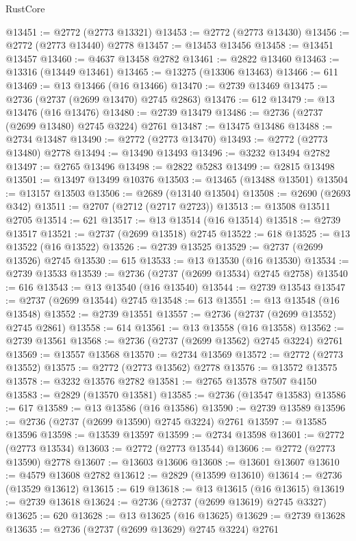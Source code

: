 \begin{lexlean}{RustCore}
\begin{coremodule}
@13451 := @2772 (@2773 @13321)
@13453 := @2772 (@2773 @13430)
@13456 := @2772 (@2773 @13440) @2778
@13457 := @13453 @13456
@13458 := @13451 @13457
@13460 := @4637 @13458 @2782
@13461 := @2822 @13460
@13463 := @13316 (@13449 @13461)
@13465 := @13275 (@13306 @13463)
@13466 := 611
@13469 := @13 @13466 (@16 @13466)
@13470 := @2739 @13469
@13475 := @2736 (@2737 (@2699 @13470) @2745 @2863)
@13476 := 612
@13479 := @13 @13476 (@16 @13476)
@13480 := @2739 @13479
@13486 := @2736 (@2737 (@2699 @13480) @2745 @3224) @2761
@13487 := @13475 @13486
@13488 := @2734 @13487
@13490 := @2772 (@2773 @13470)
@13493 := @2772 (@2773 @13480) @2778
@13494 := @13490 @13493
@13496 := @3232 @13494 @2782
@13497 := @2765 @13496
@13498 := @2822 @5283
@13499 := @2815 @13498
@13501 := @13497 @13499 @10376
@13503 := @13465 (@13488 @13501)
@13504 := @13157 @13503
@13506 := @2689 (@13140 @13504)
@13508 := @2690 (@2693 @342)
@13511 := @2707 (@2712 (@2717 @2723))
@13513 := @13508 @13511 @2705
@13514 := 621
@13517 := @13 @13514 (@16 @13514)
@13518 := @2739 @13517
@13521 := @2737 (@2699 @13518) @2745
@13522 := 618
@13525 := @13 @13522 (@16 @13522)
@13526 := @2739 @13525
@13529 := @2737 (@2699 @13526) @2745
@13530 := 615
@13533 := @13 @13530 (@16 @13530)
@13534 := @2739 @13533
@13539 := @2736 (@2737 (@2699 @13534) @2745 @2758)
@13540 := 616
@13543 := @13 @13540 (@16 @13540)
@13544 := @2739 @13543
@13547 := @2737 (@2699 @13544) @2745
@13548 := 613
@13551 := @13 @13548 (@16 @13548)
@13552 := @2739 @13551
@13557 := @2736 (@2737 (@2699 @13552) @2745 @2861)
@13558 := 614
@13561 := @13 @13558 (@16 @13558)
@13562 := @2739 @13561
@13568 := @2736 (@2737 (@2699 @13562) @2745 @3224) @2761
@13569 := @13557 @13568
@13570 := @2734 @13569
@13572 := @2772 (@2773 @13552)
@13575 := @2772 (@2773 @13562) @2778
@13576 := @13572 @13575
@13578 := @3232 @13576 @2782
@13581 := @2765 @13578 @7507 @4150
@13583 := @2829 (@13570 @13581)
@13585 := @2736 (@13547 @13583)
@13586 := 617
@13589 := @13 @13586 (@16 @13586)
@13590 := @2739 @13589
@13596 := @2736 (@2737 (@2699 @13590) @2745 @3224) @2761
@13597 := @13585 @13596
@13598 := @13539 @13597
@13599 := @2734 @13598
@13601 := @2772 (@2773 @13534)
@13603 := @2772 (@2773 @13544)
@13606 := @2772 (@2773 @13590) @2778
@13607 := @13603 @13606
@13608 := @13601 @13607
@13610 := @4579 @13608 @2782
@13612 := @2829 (@13599 @13610)
@13614 := @2736 (@13529 @13612)
@13615 := 619
@13618 := @13 @13615 (@16 @13615)
@13619 := @2739 @13618
@13624 := @2736 (@2737 (@2699 @13619) @2745 @3327)
@13625 := 620
@13628 := @13 @13625 (@16 @13625)
@13629 := @2739 @13628
@13635 := @2736 (@2737 (@2699 @13629) @2745 @3224) @2761

\end{coremodule}
\end{lexlean}
